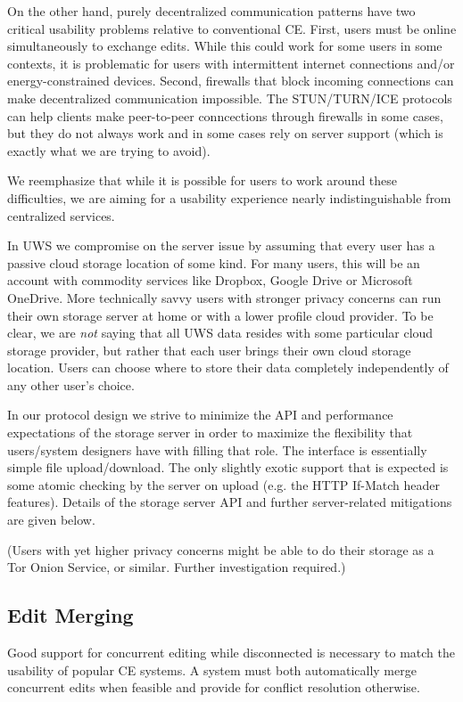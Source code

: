 \documentclass{article}
\begin{document}
On the other hand, purely decentralized communication patterns have two critical usability problems relative to conventional CE.
First, users must be online simultaneously to exchange edits.
While this could work for some users in some contexts, it is problematic for users with intermittent internet connections and/or energy-constrained devices.
Second, firewalls that block incoming connections can make decentralized communication impossible.
The STUN/TURN/ICE protocols can help clients make peer-to-peer conncections through firewalls in some cases, but they do not always work and in some cases rely on server support (which is exactly what we are trying to avoid).

We reemphasize that while it is possible for users to work around these difficulties, we are aiming for a usability experience nearly indistinguishable from centralized services.

In UWS we compromise on the server issue by assuming that every user has a passive cloud storage location of some kind.
For many users, this will be an account with commodity services like Dropbox, Google Drive or Microsoft OneDrive.
More technically savvy users with stronger privacy concerns can run their own storage server at home or with a lower profile cloud provider.
To be clear, we are \emph{not} saying that all UWS data resides with some particular cloud storage provider, but rather that each user brings their own cloud storage location.
Users can choose where to store their data completely independently of any other user's choice.

In our protocol design we strive to minimize the API and performance expectations of the storage server in order to maximize the flexibility that users/system designers have with filling that role.
The interface is essentially simple file upload/download.
The only slightly exotic support that is expected is some atomic checking by the server on upload (e.g. the HTTP If-Match header features).
Details of the storage server API and further server-related mitigations are given below.

(Users with yet higher privacy concerns might be able to do their storage as a Tor Onion Service, or similar.
Further investigation required.)

\subsection{Edit Merging}

Good support for concurrent editing while disconnected is necessary to match the usability of popular CE systems.
A system must both automatically merge concurrent edits when feasible and provide for conflict resolution otherwise.
\end{document}
